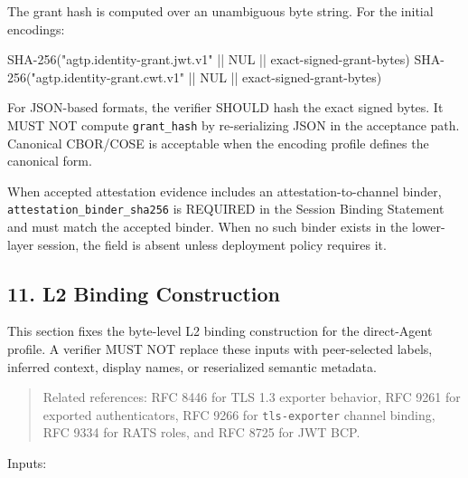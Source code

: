 \documentclass[
]{article}
\newenvironment{Shaded}{}{}
\newcommand{\NormalTok}[1]{#1}
\begin{document}
The grant hash is computed over an unambiguous byte string. For the
initial encodings:

\begin{Shaded}
\begin{Highlighting}[]
\NormalTok{SHA{-}256("agtp.identity{-}grant.jwt.v1" || NUL || exact{-}signed{-}grant{-}bytes)}
\NormalTok{SHA{-}256("agtp.identity{-}grant.cwt.v1" || NUL || exact{-}signed{-}grant{-}bytes)}
\end{Highlighting}
\end{Shaded}

For JSON-based formats, the verifier SHOULD hash the exact signed bytes.
It MUST NOT compute \texttt{grant\_hash} by re-serializing JSON in the
acceptance path. Canonical CBOR/COSE is acceptable when the encoding
profile defines the canonical form.

When accepted attestation evidence includes an attestation-to-channel
binder, \texttt{attestation\_binder\_sha256} is REQUIRED in the Session
Binding Statement and must match the accepted binder. When no such
binder exists in the lower-layer session, the field is absent unless
deployment policy requires it.

\subsection{11. L2 Binding Construction}\label{l2-binding-construction}

This section fixes the byte-level L2 binding construction for the
direct-Agent profile. A verifier MUST NOT replace these inputs with
peer-selected labels, inferred context, display names, or reserialized
semantic metadata.

\begin{quote}
Related references: RFC 8446 for TLS 1.3 exporter behavior, RFC 9261
for exported authenticators, RFC 9266 for \texttt{tls-exporter} channel
binding, RFC 9334 for RATS roles, and RFC 8725 for JWT BCP.
\end{quote}

Inputs:
\end{document}
